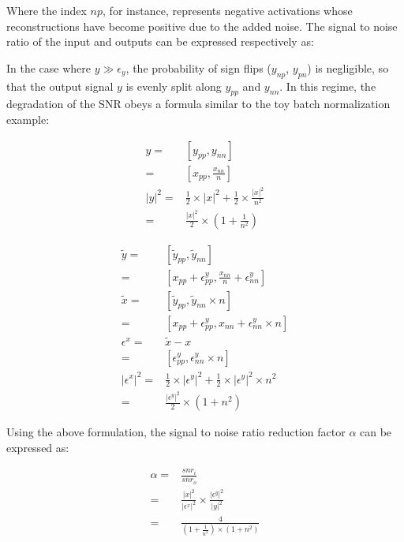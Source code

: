 \documentclass[twocolumn]{bmcart}
\begin{document}
\begin{backmatter}
Where the index $np$, for instance, represents negative activations whose reconstructions have become positive due to the added noise.
The signal to noise ratio of the input and outputs can be expressed respectively as:

In the case where $y \gg \epsilon_y$, the probability of sign flips ($y_{np}$, $y_{pn}$) is negligible,
so that the output signal $y$ is evenly split along $y_{pp}$ and $y_{nn}$.
In this regime, the degradation of the SNR obeys a formula similar to the toy batch normalization example:

\begin{subequations}
\begin{align}
 y =& [y_{pp}, y_{nn}] \\
   =& [x_{pp}, \frac{x_{nn}}{n}] \\
 |y|^2 =& \frac{1}{2} \times |x|^2 + \frac{1}{2} \times \frac{|x|^2}{n^2} \\
       =&\frac{|x|^2}{2} \times (1+\frac{1}{n^2})
\end{align}
\end{subequations}

\begin{subequations}
\begin{align}
\tilde{y}       =& [ \tilde{y}_{pp}, \tilde{y}_{nn}] \\
                =& [ x_{pp} + \epsilon_{pp}^y, \frac{x_{nn}}{n} + \epsilon_{nn}^y ] \\
\tilde{x}       =& [ \tilde{y}_{pp}, \tilde{y}_{nn} \times n] \\
                =& [ x_{pp} + \epsilon_{pp}^y, x_{nn} + \epsilon_{nn}^y \times n  ]\\
\epsilon^x      =& \tilde{x} - x\\
                =& [ \epsilon_{pp}^y, \epsilon_{nn}^y \times n ]\\
|\epsilon^x|^2  =& \frac{1}{2} \times |\epsilon^y|^2 + \frac{1}{2} \times |\epsilon^y|^2 \times n^2 \\
                =& \frac{|\epsilon^y|^2}{2} \times (1 + n^2)
\end{align}
\end{subequations}

Using the above formulation, the signal to noise ratio reduction factor $\alpha$ can be expressed as:

\begin{subequations}
\begin{align}
\alpha =& \frac{snr_i}{snr_o} \\
       =& \frac{|x|^2}{|\epsilon^x|^2} \times  \frac{|\epsilon^y|^2}{|y|^2} \\
       =& \frac{4}{(1+\frac{1}{n^2}) \times (1 + n^2)}
\end{align}
\end{subequations}


\end{backmatter}
\end{document}
